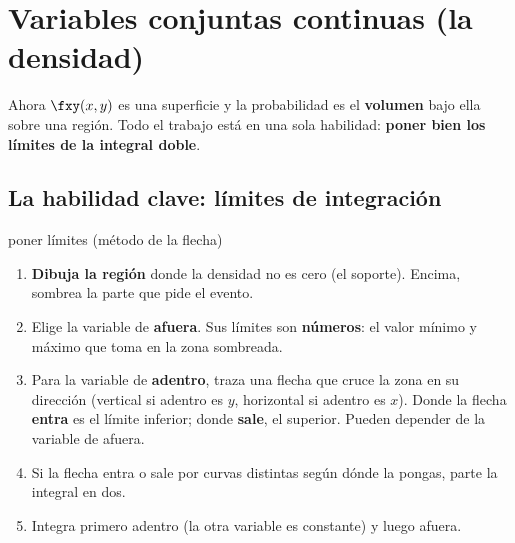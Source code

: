 \section{Variables conjuntas continuas (la densidad)}

Ahora $\fxy(x,y)$ es una superficie y la probabilidad es el \textbf{volumen} bajo ella sobre una regi\'on.
Todo el trabajo est\'a en una sola habilidad: \textbf{poner bien los l\'imites de la integral doble}.

\subsection{La habilidad clave: l\'imites de integraci\'on}

\begin{receta}{poner l\'imites (m\'etodo de la flecha)}
\begin{enumerate}
\item \textbf{Dibuja la regi\'on} donde la densidad no es cero (el \guillemotleft soporte\guillemotright).
Encima, sombrea la parte que pide el evento.
\item Elige la variable de \textbf{afuera}. Sus l\'imites son \textbf{n\'umeros}: el valor m\'inimo y m\'aximo que toma en la zona sombreada.
\item Para la variable de \textbf{adentro}, traza una flecha que cruce la zona en su direcci\'on
(vertical si adentro es $y$, horizontal si adentro es $x$). Donde la flecha \textbf{entra} es el l\'imite inferior;
donde \textbf{sale}, el superior. Pueden depender de la variable de afuera.
\item Si la flecha entra o sale por curvas distintas seg\'un d\'onde la pongas, parte la integral en dos.
\item Integra primero adentro (la otra variable es constante) y luego afuera.
\end{enumerate}
\end{receta}

